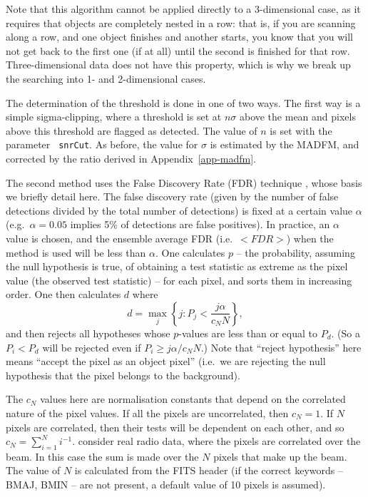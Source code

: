 \documentclass[12pt,a4paper]{article}
\newcommand{\eg}{e.g.\ }
\newcommand{\ie}{i.e.\ }
\begin{document}
Note that this algorithm cannot be applied directly to a 3-dimensional
case, as it requires that objects are completely nested in a row: that
is, if you are scanning along a row, and one object finishes and
another starts, you know that you will not get back to the first one
(if at all) until the second is finished for that
row. Three-dimensional data does not have this property, which is why
we break up the searching into 1- and 2-dimensional cases.

The determination of the threshold is done in one of two ways. The
first way is a simple sigma-clipping, where a threshold is set at
$n\sigma$ above the mean and pixels above this threshold are
flagged as detected. The value of $n$ is set with the parameter {\tt
  snrCut}. As before, the value for $\sigma$ is estimated by
the MADFM, and corrected by the ratio derived in
Appendix~\ref{app-madfm}. 

The second method uses the False Discovery Rate (FDR) technique
\citep{miller01,hopkins02}, whose basis we briefly detail here. The
false discovery rate (given by the number of false detections divided
by the total number of detections) is fixed at a certain value
$\alpha$ (\eg $\alpha=0.05$ implies 5\% of detections are false
positives). In practice, an $\alpha$ value is chosen, and the ensemble
average FDR (\ie $<FDR>$) when the method is used will be less than
$\alpha$.  One calculates $p$ -- the probability, assuming the null
hypothesis is true, of obtaining a test statistic as extreme as the
pixel value (the observed test statistic) -- for each pixel, and sorts
them in increasing order. One then calculates $d$ where
\[
d = \max_j \left\{ j : P_j < \frac{j\alpha}{c_N N} \right\},
\]
and then rejects all hypotheses whose $p$-values are less than or equal
to $P_d$. (So a $P_i<P_d$ will be rejected even if $P_i \geq
j\alpha/c_N N$.) Note that ``reject hypothesis'' here means ``accept
the pixel as an object pixel'' (\ie we are rejecting the null
hypothesis that the pixel belongs to the background). 

The $c_N$ values here are normalisation constants that depend on the
correlated nature of the pixel values. If all the pixels are
uncorrelated, then $c_N=1$. If $N$ pixels are correlated, then their
tests will be dependent on each other, and so $c_N = \sum_{i=1}^N
i^{-1}$. \citet{hopkins02} consider real radio data, where the pixels
are correlated over the beam. In this case the sum is made over the
$N$ pixels that make up the beam. The value of $N$ is calculated from
the FITS header (if the correct keywords -- BMAJ, BMIN -- are not
present, a default value of 10 pixels is assumed).
\end{document}

